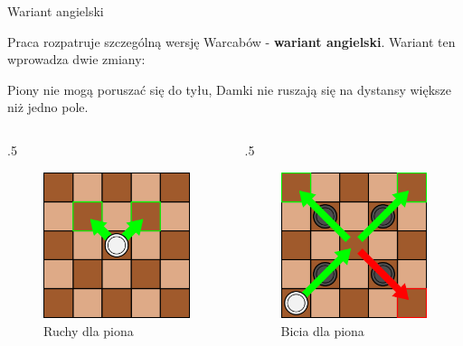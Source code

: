 \begin{frame}{Wariant angielski}



	Praca rozpatruje szczególną wersję Warcabów - \textbf{wariant angielski}.
	Wariant ten wprowadza dwie zmiany:
	\begin{itemize}
		\myitem Piony nie mogą poruszać się do tyłu,
		\myitem Damki nie ruszają się na dystansy większe niż jedno pole.
	\end{itemize}

	\begin{columns}
		\begin{column}{.5\hsize}
			{\centering
			\begin{figure}
				\includegraphics[scale=.25]{figures/warcaby_ruchyPionZwykle3.png}
				\caption{Ruchy dla piona}
			\end{figure}
			}
		\end{column}
		\begin{column}{.5\hsize}
			{\centering
			\begin{figure}
				\includegraphics[scale=.25]{figures/warcaby_ruchyPionBicia.png}
				\caption{Bicia dla piona}
			\end{figure}
			}
		\end{column}
	\end{columns}


\end{frame}
